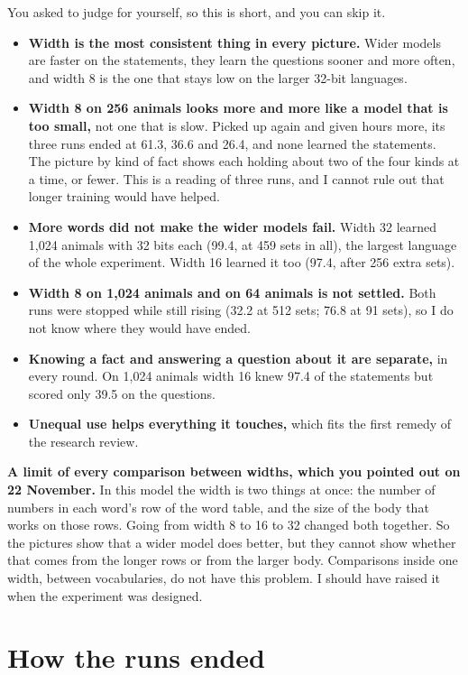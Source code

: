 You asked to judge for yourself, so this is short, and you can skip it.
\begin{itemize}
\item \textbf{Width is the most consistent thing in every picture.} Wider models are faster on
      the statements, they learn the questions sooner and more often, and width 8 is the one
      that stays low on the larger 32-bit languages.
\item \textbf{Width 8 on 256 animals looks more and more like a model that is too small,} not
      one that is slow. Picked up again and given hours more, its three runs ended at 61.3,
      36.6 and 26.4, and none learned the statements. The picture by kind of fact shows each
      holding about two of the four kinds at a time, or fewer. This is a reading of three runs, and
      I cannot rule out that longer training would have helped.
\item \textbf{More words did not make the wider models fail.} Width 32 learned 1,024 animals
      with 32 bits each (99.4, at 459 sets in all), the largest language of the whole
      experiment. Width 16 learned it too (97.4, after 256 extra sets).
\item \textbf{Width 8 on 1,024 animals and on 64 animals is not settled.} Both runs were
      stopped while still rising (32.2 at 512 sets; 76.8 at 91 sets), so I do not know where
      they would have ended.
\item \textbf{Knowing a fact and answering a question about it are separate,} in every round.
      On 1,024 animals width 16 knew 97.4 of the statements but scored only 39.5 on the
      questions.
\item \textbf{Unequal use helps everything it touches,} which fits the first remedy of the
      research review.
\end{itemize}

\textbf{A limit of every comparison between widths, which you pointed out on 22 November.}
In this model the width is two things at once: the number of numbers in each word's row of
the word table, and the size of the body that works on those rows. Going from width 8 to 16
to 32 changed both together. So the pictures show that a wider model does better, but they
cannot show whether that comes from the longer rows or from the larger body. Comparisons
inside one width, between vocabularies, do not have this problem. I should have raised it
when the experiment was designed.

\section{How the runs ended}

